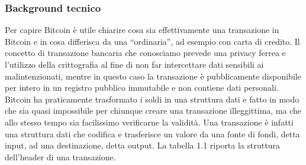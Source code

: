 \subsubsection{Background tecnico}
\cite{masteringbitcoin,bitcoinofficialdoc,bitcoinwiki}Per capire Bitcoin è utile chiarire cosa sia effettivamente una transazione in Bitcoin e in cosa differisca da una “ordinaria”, ad esempio con carta di credito. Il concetto di transazione bancaria che conosciamo prevede una privacy ferrea e l’utilizzo della crittografia al fine di non far intercettare dati sensibili ai malintenzionati, mentre in questo caso la transazione è pubblicamente disponibile per intero in un registro pubblico immutabile e non contiene dati personali. Bitcoin ha praticamente trasformato i soldi in una struttura dati e fatto in modo che sia quasi impossibile per chiunque creare una transazione illeggittima, ma che allo stesso tempo sia facilissimo verificarne la validità. Una transazione è infatti una struttura dati che codifica e trasferisce un valore da una fonte di fondi, detta input, ad una destinazione, detta output. La tabella 1.1 riporta la struttura dell'header di una transazione.

\begin{table}[ht]
	\centering
\caption{Struttura dell'header di una transazione Bitcoin \cite{masteringbitcoin}}
\end{table}


